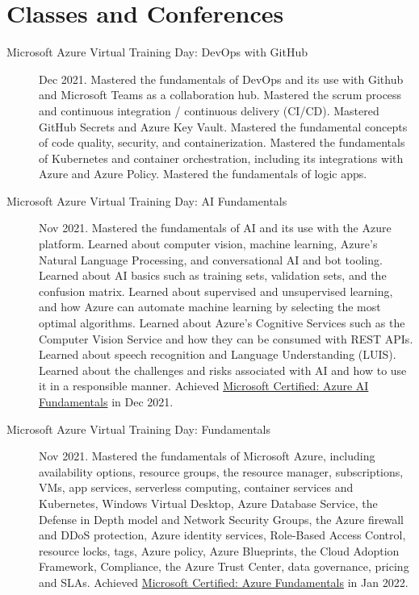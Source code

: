 \documentclass{article}
\begin{document}
\section*{Classes and Conferences}\vspace{-0.5em}
\begin{description}
  \item [Microsoft Azure Virtual Training Day: DevOps with GitHub] Dec 2021. Mastered the fundamentals of DevOps and its use with Github and Microsoft Teams as a collaboration hub. Mastered the scrum process and continuous integration / continuous delivery (CI/CD). Mastered GitHub Secrets and Azure Key Vault. Mastered the fundamental concepts of code quality, security, and containerization. Mastered the fundamentals of Kubernetes and container orchestration, including its integrations with Azure and Azure Policy. Mastered the fundamentals of logic apps.
  \item [Microsoft Azure Virtual Training Day: AI Fundamentals] Nov 2021. Mastered the fundamentals of AI and its use with the Azure platform. Learned about computer vision, machine learning, Azure's Natural Language Processing, and conversational AI and bot tooling. Learned about AI basics such as training sets, validation sets, and the confusion matrix. Learned about supervised and unsupervised learning, and how Azure can automate machine learning by selecting the most optimal algorithms. Learned about Azure's Cognitive Services such as the Computer Vision Service and how they can be consumed with REST APIs. Learned about speech recognition and Language Understanding (LUIS). Learned about the challenges and risks associated with AI and how to use it in a responsible manner. Achieved \href{https://www.credly.com/badges/fa66cf6b-dff5-4f58-9f4e-4b94fc91b7fa/public_url}{Microsoft Certified: Azure AI Fundamentals} in Dec 2021.
  \item [Microsoft Azure Virtual Training Day: Fundamentals] Nov 2021. Mastered the fundamentals of Microsoft Azure, including availability options, resource groups, the resource manager, subscriptions, VMs, app services, serverless computing, container services and Kubernetes, Windows Virtual Desktop, Azure Database Service, the Defense in Depth model and Network Security Groups, the Azure firewall and DDoS protection, Azure identity services, Role-Based Access Control, resource locks, tags, Azure policy, Azure Blueprints, the Cloud Adoption Framework, Compliance, the Azure Trust Center, data governance, pricing and SLAs. Achieved \href{https://www.credly.com/badges/56339905-a587-4fdb-9906-c2d2bb5d31da/public_url}{Microsoft Certified: Azure Fundamentals} in Jan 2022.

\end{description}
\end{document}
